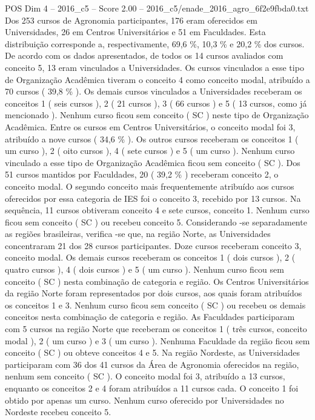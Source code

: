 \begin{textsample}{POS Dim 4 – 2016\_c5 – Score 2.00 – 2016\_c5/enade\_2016\_agro\_6f2e9fbda0.txt}
Dos 253 cursos de Agronomia participantes, 176 eram oferecidos em Universidades, 26 em Centros Universitários e 51 em Faculdades.
Esta distribuição corresponde a, respectivamente, 69,6 \%, 10,3 \% e 20,2 \% dos cursos.
De acordo com os dados apresentados, de todos os 14 cursos avaliados com conceito 5, 13 eram vinculados a Universidades.
Os cursos vinculados a esse tipo de Organização Acadêmica tiveram o conceito 4 como conceito modal, atribuído a 70 cursos ( 39,8 \% ).
Os demais cursos vinculados a Universidades receberam os conceitos 1 ( seis cursos ), 2 ( 21 cursos ), 3 ( 66 cursos ) e 5 ( 13 cursos, como já mencionado ).
Nenhum curso ficou sem conceito ( SC ) neste tipo de Organização Acadêmica.
Entre os cursos em Centros Universitários, o conceito modal foi 3, atribuído a nove cursos ( 34,6 \% ).
Os outros cursos receberam os conceitos 1 ( um curso ), 2 ( oito cursos ), 4 ( sete cursos ) e 5 ( um curso ).
Nenhum curso vinculado a esse tipo de Organização Acadêmica ficou sem conceito ( SC ).
Dos 51 cursos mantidos por Faculdades, 20 ( 39,2 \% ) receberam conceito 2, o conceito modal.
O segundo conceito mais frequentemente atribuído aos cursos oferecidos por essa categoria de IES foi o conceito 3, recebido por 13 cursos.
Na sequência, 11 cursos obtiveram conceito 4 e sete cursos, conceito 1.
Nenhum curso ficou sem conceito ( SC ) ou recebeu conceito 5.
Considerando -se separadamente as regiões brasileiras, verifica -se que, na região Norte, as Universidades concentraram 21 dos 28 cursos participantes.
Doze cursos receberam conceito 3, conceito modal.
Os demais cursos receberam os conceitos 1 ( dois cursos ), 2 ( quatro cursos ), 4 ( dois cursos ) e 5 ( um curso ).
Nenhum curso ficou sem conceito ( SC ) nesta combinação de categoria e região.
Os Centros Universitários da região Norte foram representados por dois cursos, aos quais foram atribuídos os conceitos 1 e 3.
Nenhum curso ficou sem conceito ( SC ) ou recebeu os demais conceitos nesta combinação de categoria e região.
As Faculdades participaram com 5 cursos na região Norte que receberam os conceitos 1 ( três cursos, conceito modal ), 2 ( um curso ) e 3 ( um curso ).
Nenhuma Faculdade da região ficou sem conceito ( SC ) ou obteve conceitos 4 e 5.
Na região Nordeste, as Universidades participaram com 36 dos 41 cursos da Área de Agronomia oferecidos na região, nenhum sem conceito ( SC ).
O conceito modal foi 3, atribuído a 13 cursos, enquanto os conceitos 2 e 4 foram atribuídos a 11 cursos cada.
O conceito 1 foi obtido por apenas um curso.
Nenhum curso oferecido por Universidades no Nordeste recebeu conceito 5.

\end{textsample}
